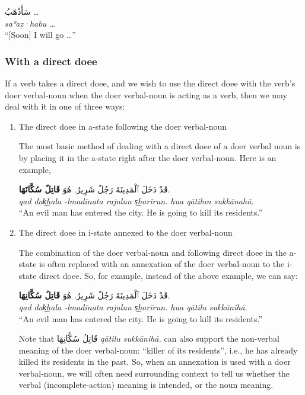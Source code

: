\documentclass[
  10pt,
]{book}
\begin{document}
\foreignlanguage{arabic}{سَأَذْهَبُ \ldots{}}\\
\emph{saʾaẕ·habu \ldots{}}\\
\enquote{{[}Soon{]} I will go \ldots{}}

\subsubsection{With a direct doee}\label{with-a-direct-doee-1}

If a verb takes a direct doee, and we wish to use the direct doee with the verb's doer verbal-noun when the doer verbal-noun is acting as a verb, then we may deal with it in one of three ways:

\begin{enumerate}
\def\labelenumi{\arabic{enumi}.}
\item
  The direct doee in a-state following the doer verbal-noun

  The most basic method of dealing with a direct doee of a doer verbal noun is by placing it in the a-state right after the doer verbal-noun. Here is an example,

  \foreignlanguage{arabic}{قَدْ دَخَلَ ٱلْمَدِينَةَ رَجُلٌ شَرِيرٌ. هُوَ \textbf{قَاتِلٌ سُكَّانَهَا}.}\\
  \emph{qad dak͟hala -lmadīnata rajulun s͟harīrun. hua qātilun sukkānahā.}\\
  \enquote{An evil man has entered the city. He is going to kill its residents.}
\item
  The direct doee in i-state annexed to the doer verbal-noun

  The combination of the doer verbal-noun and following direct doee in the a-state is often replaced with an annexation of the doer verbal-noun to the i-state direct doee. So, for example, instead of the above example, we can say:

  \foreignlanguage{arabic}{قَدْ دَخَلَ ٱلْمَدِينَةَ رَجُلٌ شَرِيرٌ. هُوَ \textbf{قَاتِلُ سُكَّانِهَا}.}\\
  \emph{qad dak͟hala -lmadīnata rajulun s͟harīrun. hua qātilu sukkānihā.}\\
  \enquote{An evil man has entered the city. He is going to kill its residents.}

  Note that \foreignlanguage{arabic}{قَاتِلُ سُکَّانِهَا} \emph{qātilu sukkānihā.} can also support the non-verbal meaning of the doer verbal-noun: \enquote{killer of its residents}, i.e., he has already killed its residents in the past. So, when an annexation is used with a doer verbal-noun, we will often need surrounding context to tell us whether the verbal (incomplete-action) meaning is intended, or the noun meaning.


\end{enumerate}
\end{document}
